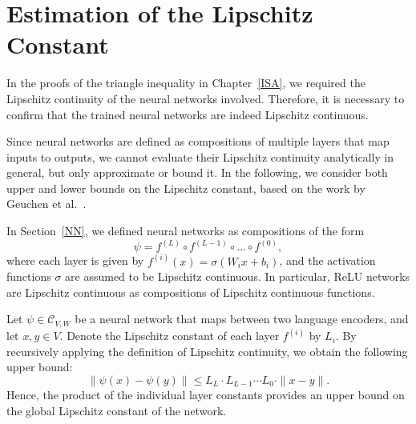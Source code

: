 
\section{Estimation of the Lipschitz Constant}


In the proofs of the triangle inequality in Chapter~\ref{ISA}, we required the Lipschitz continuity of the neural networks involved. Therefore, it is necessary to confirm that the trained neural networks are indeed Lipschitz continuous.

Since neural networks are defined as compositions of multiple layers that map inputs to outputs, we cannot evaluate their Lipschitz continuity analytically in general, but only approximate or bound it. In the following, we consider both upper and lower bounds on the Lipschitz constant, based on the work by Geuchen et al.~\cite{geuchen_upper_2024}.

In Section~\ref{NN}, we defined neural networks as compositions of the form
\[
\psi = f^{(L)} \circ f^{(L-1)} \circ \dots \circ f^{(0)},
\]
where each layer is given by \( f^{(i)}(x) = \sigma(W_i x + b_i) \), and the activation functions \( \sigma \) are assumed to be Lipschitz continuous. 
In particular, ReLU networks are Lipschitz continuous as compositions of Lipschitz continuous functions.

Let \( \psi \in \mathcal{C}_{V,W} \) be a neural network that maps between two language encoders, and let \( x, y \in V \). Denote the Lipschitz constant of each layer \( f^{(i)} \) by \( L_i \). By recursively applying the definition of Lipschitz continuity, we obtain the following upper bound:
\[
\|\psi(x) - \psi(y)\| \leq L_L \cdot L_{L-1} \cdots L_0 \cdot \|x - y\|.
\]
Hence, the product of the individual layer constants provides an upper bound on the global Lipschitz constant of the network.

